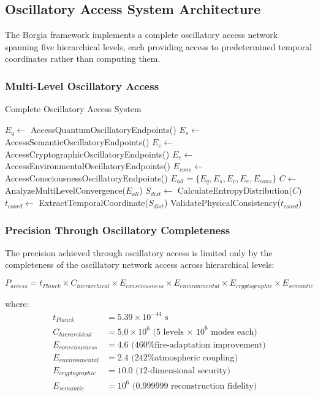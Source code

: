﻿\documentclass[11pt,a4paper]{article}
\begin{document}
\subsection{Oscillatory Access System Architecture}

The Borgia framework implements a complete oscillatory access network spanning five hierarchical levels, each providing access to predetermined temporal coordinates rather than computing them.

\subsubsection{Multi-Level Oscillatory Access}

\begin{algorithm}
\caption{Complete Oscillatory Access System}
\begin{algorithmic}
    \State $E_q \leftarrow$ AccessQuantumOscillatoryEndpoints()
    \State $E_s \leftarrow$ AccessSemanticOscillatoryEndpoints() 
    \State $E_c \leftarrow$ AccessCryptographicOscillatoryEndpoints()
    \State $E_e \leftarrow$ AccessEnvironmentalOscillatoryEndpoints()
    \State $E_{cons} \leftarrow$ AccessConsciousnessOscillatoryEndpoints()
    \State $E_{all} = \{E_q, E_s, E_c, E_e, E_{cons}\}$
    \State $C \leftarrow$ AnalyzeMultiLevelConvergence($E_{all}$)
    \State $S_{dist} \leftarrow$ CalculateEntropyDistribution($C$)
    \State $t_{coord} \leftarrow$ ExtractTemporalCoordinate($S_{dist}$)
    \State \Return ValidatePhysicalConsistency($t_{coord}$)
\EndProcedure
\end{algorithmic}
\end{algorithm}

\subsubsection{Precision Through Oscillatory Completeness}

The precision achieved through oscillatory access is limited only by the completeness of the oscillatory network access across hierarchical levels:

\begin{equation}
P_{access} = t_{Planck} \times C_{hierarchical} \times E_{consciousness} \times E_{environmental} \times E_{cryptographic} \times E_{semantic}
\end{equation}

where:
\begin{align}
t_{Planck} &= 5.39 \times 10^{-44} \text{ s} \\
C_{hierarchical} &= 5.0 \times 10^6 \text{ (5 levels × 10}^6 \text{ modes each)} \\
E_{consciousness} &= 4.6 \text{ (460\% fire-adaptation improvement)} \\
E_{environmental} &= 2.4 \text{ (242\% atmospheric coupling)} \\
E_{cryptographic} &= 10.0 \text{ (12-dimensional security)} \\
E_{semantic} &= 10^6 \text{ (0.999999 reconstruction fidelity)}
\end{align}
\end{document}

